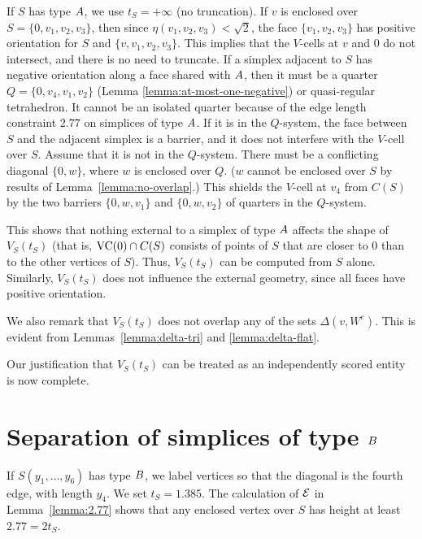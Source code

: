 If $S$ has type $A$, we use $t_S=+\infty$ (no truncation).  If
$v$ is enclosed over $S=\{0,v_1,v_2,v_3\}$, then since
$\eta(v_1,v_2,v_3)<\sqrt{2}$, the face $\{v_1,v_2,v_3\}$ has
positive orientation for $S$ and $\{v,v_1,v_2,v_3\}$. This implies
that the $V$-cells at $v$ and $0$ do not intersect, and there is
no need to truncate.  If a simplex adjacent to $S$ has negative
orientation along a face shared with $A$, then it must be a
quarter $Q=\{0,v_4,v_1,v_2\}$ (Lemma
\ref{lemma:at-most-one-negative}) or quasi-regular tetrahedron. It
cannot be an isolated quarter because of the edge length
constraint $2.77$ on simplices of type $A$. If it is in the
$Q$-system, the face between $S$ and the adjacent simplex is a
barrier, and it does not interfere with the $V$-cell over $S$.
Assume that it is not in the $Q$-system. There must be a
conflicting diagonal $\{0,w\}$, where $w$ is enclosed over $Q$. ($w$
cannot be enclosed over $S$ by results of
Lemma~\ref{lemma:no-overlap}.) This shields the $V$-cell at $v_4$
from $C(S)$ by the two barriers $\{0,w,v_1\}$ and $\{0,w,v_2\}$ of
quarters in the $Q$-system.

This shows that nothing external to a simplex of type $A$
affects the shape of $V_S(t_S)$ (that is, ${\operatorname{VC}}(0)\cap C(S)$
consists of points of $S$ that are closer to $0$ than to the other
vertices of $S$).  Thus,  $V_S(t_S)$ can be computed from $S$
alone. Similarly, $V_S(t_S)$ does not influence the external
geometry, since all faces have positive orientation.

We also remark that $V_S(t_S)$ does not overlap any of the sets
$\Delta(v,W^e)$.  This is evident from
Lemmas~\ref{lemma:delta-tri} and \ref{lemma:delta-flat}.


Our justification that $V_S(t_S)$ can be treated as an
independently scored entity is now complete.

\section{Separation of simplices of type $B$}

If $S(y_1,\ldots,y_6)$ has type $B$, we label vertices so that
the diagonal is the fourth edge, with length $y_4$. We set
$t_S=1.385$. The calculation of ${\mathcal E}$ in Lemma~\ref{lemma:2.77}
shows that any enclosed vertex over $S$ has height at least
$2.77=2t_S$.

